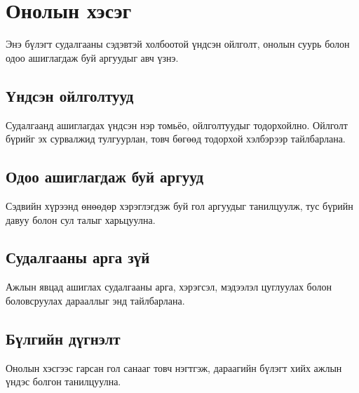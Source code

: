 \chapter{Онолын хэсэг}

Энэ бүлэгт судалгааны сэдэвтэй холбоотой үндсэн ойлголт, онолын суурь болон одоо ашиглагдаж буй аргуудыг авч үзнэ.

\section{Үндсэн ойлголтууд}

Судалгаанд ашиглагдах үндсэн нэр томьёо, ойлголтуудыг тодорхойлно. Ойлголт бүрийг эх сурвалжид тулгуурлан, товч бөгөөд тодорхой хэлбэрээр тайлбарлана.

\section{Одоо ашиглагдаж буй аргууд}

Сэдвийн хүрээнд өнөөдөр хэрэглэгдэж буй гол аргуудыг танилцуулж, тус бүрийн давуу болон сул талыг харьцуулна.

\section{Судалгааны арга зүй}

Ажлын явцад ашиглах судалгааны арга, хэрэгсэл, мэдээлэл цуглуулах болон боловсруулах дарааллыг энд тайлбарлана.

\section{Бүлгийн дүгнэлт}

Онолын хэсгээс гарсан гол санааг товч нэгтгэж, дараагийн бүлэгт хийх ажлын үндэс болгон танилцуулна.
